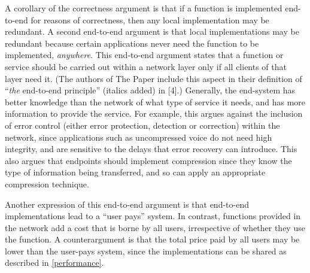 \documentclass[a4paper,11pt,notitlepage,twoside,openright]{article}
\begin{document}
A corollary of the correctness argument is that if a function is
implemented end-to-end for reasons of correctness, then any local
implementation may be redundant. A second end-to-end argument is that
local implementations may be redundant because certain applications
never need the function to be implemented, \emph{anywhere}. This
end-to-end argument states that a function or service should be carried
out within a network layer only if all clients of that layer need it.
(The authors of The Paper include this aspect in their definition of
``\emph{the} end-to-end principle'' (italics added) in {[}4{]}.)
Generally, the end-system has better knowledge than the network of what
type of service it needs, and has more information to provide the
service. For example, this argues against the inclusion of error control
(either error protection, detection or correction) within the network,
since applications such as uncompressed voice do not need high
integrity, and are sensitive to the delays that error recovery can
introduce. This also argues that endpoints should implement compression
since they know the type of information being transferred, and so can
apply an appropriate compression technique.

Another expression of this end-to-end argument is that end-to-end
implementations lead to a ``user pays'' system. In contrast, functions
provided in the network add a cost that is borne by all users,
irrespective of whether they use the function. A counterargument is that
the total price paid by all users may be lower than the user-pays
system, since the implementations can be shared as described in \autoref{performance}.
\end{document}
